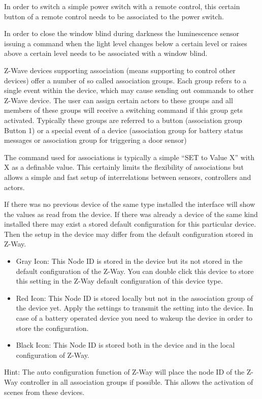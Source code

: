 
In order to switch a simple power switch with a remote control, this certain button of a remote control 
needs to be associated to the power switch.

In order to close the window blind during darkness the luminescence sensor issuing a command when the 
light level changes below a certain level or raises above a certain level needs to be associated 
with a window blind. 

Z-Wave devices supporting association (means supporting to control other devices) offer a number 
of so called association groups.  Each group refers to a single event within the device, which may 
cause sending out commands to other Z-Wave device. The user can assign certain actors to these 
groups and all members of these groups will receive a switching command if this group gets activated. 
Typically these groups are referred to a button (association group Button 1) or a special event of
a device (association group for battery status messages or association group for triggering a door sensor)

The command used for associations is typically a simple “SET to Value X” with X as a definable value. 
This certainly limits the flexibility of associations but allows a simple and fast setup of
interrelations between sensors, controllers and actors.
 
If there was no previous device of the same type installed the interface will show the values as 
read from the device. If there was already a device of the same kind installed there may exist a 
stored default configuration for this particular device. Then the setup in the device may differ 
from the default configuration stored in Z-Way.

\begin{itemize}
\item  Gray Icon: This Node ID is stored in the device but its not stored in the default configuration 
of the Z-Way. You can double click this device to store this setting in the Z-Way default configuration 
of this device type.

\item  Red Icon: This Node ID is stored locally but not in the association group of the device yet. 
Apply the settings to transmit the setting into the device.  In case of a battery operated device you 
need to wakeup the device in order to store the configuration.

\item  Black Icon: This Node ID is stored both in the device and in the local configuration of Z-Way.
\end{itemize}
Hint: The auto configuration function of Z-Way will place the node ID of the Z-Way controller in all 
association groups if possible. This allows the activation of scenes from these devices. 

